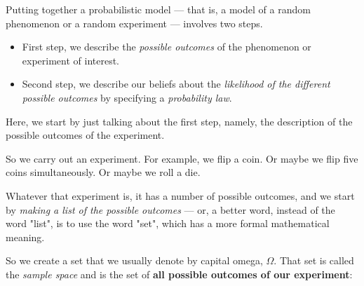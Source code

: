 \documentclass[pdftex, brazil, 12pt, twoside]{article}
\begin{document}
Putting together a probabilistic model ---
that is, a model of a random phenomenon or a random
experiment --- involves two steps.

\begin{itemize}
\item First step, we describe the \emph{possible outcomes} of the
  phenomenon or experiment of interest.
\item Second step, we describe our beliefs about the \emph{likelihood
  of the different possible outcomes} by specifying a \emph{probability law}.
\end{itemize}
Here, we start by just talking about the first step, namely,
the description of the possible outcomes of the
experiment.

\begin{figure}[H]
  \begin{center}
  \end{center}
\end{figure}

So we carry out an experiment.
For example, we flip a coin.
Or maybe we flip five coins simultaneously.
Or maybe we roll a die.

Whatever that experiment is, it has a number of possible
outcomes, and we start by \emph{making a list of
the possible outcomes} ---
or, a better word, instead of the word "list", is to use the
word "set", which has a more formal mathematical meaning.

So we create a set that we usually
denote by capital omega, $\Omega$.
That set is called the \emph{sample space} and is the set of \textbf{all
possible outcomes of our experiment}:

\begin{figure}[H]
  \begin{center}
  \end{center}
\end{figure}
\end{document}
